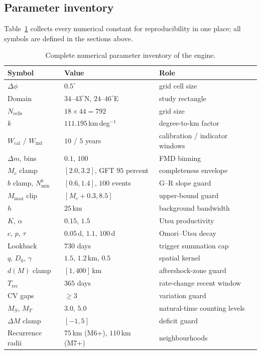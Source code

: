 \documentclass[11pt,a4paper]{article}
\begin{document}
\subsection{Parameter inventory}
Table~\ref{tab:params} collects every numerical constant for reproducibility
in one place; all symbols are defined in the sections above.

\begin{table}[h]
\centering
\caption{Complete numerical parameter inventory of the engine.}
\label{tab:params}
\begin{tabular}{lll}
\toprule
Symbol & Value & Role\\
\midrule
$\Delta\phi$ & $0.5^\circ$ & grid cell size\\
Domain & $34$--$43^\circ$N, $24$--$46^\circ$E & study rectangle\\
$N_{\text{cells}}$ & $18\times44=792$ & grid size\\
$k$ & $111.195$\,km\,deg$^{-1}$ & degree-to-km factor\\
$W_{\text{cal}}$ / $W_{\text{ind}}$ & $10$ / $5$ years & calibration / indicator windows\\
$\Delta m$, bins & $0.1$, $100$ & FMD binning\\
$M_c$ clamp & $[2.0,3.2]$, GFT $95$ percent & completeness envelope\\
$b$ clamp, $N_{\min}^{b}$ & $[0.6,1.4]$, $100$ events & G--R slope guard\\
$M_{\max}$ clip & $[M_c+0.3,8.5]$ & upper-bound guard\\
$h$ & $25$\,km & background bandwidth\\
$K$, $\alpha$ & $0.15$, $1.5$ & Utsu productivity\\
$c$, $p$, $\tau$ & $0.05$\,d, $1.1$, $100$\,d & Omori--Utsu decay\\
Lookback & $730$ days & trigger summation cap\\
$q$, $D_0$, $\gamma$ & $1.5$, $1.2$\,km, $0.5$ & spatial kernel\\
$d(M)$ clamp & $[1,400]$\,km & aftershock-zone guard\\
$T_{\text{rec}}$ & $365$ days & rate-change recent window\\
CV gaps & $\ge3$ & variation guard\\
$M_S$, $M_T$ & $3.0$, $5.0$ & natural-time counting levels\\
$\Delta M$ clamp & $[-1,5]$ & deficit guard\\
Recurrence radii & $75$\,km (M6+), $110$\,km (M7+) & neighbourhoods\\

\end{tabular}
\end{table}
\end{document}

